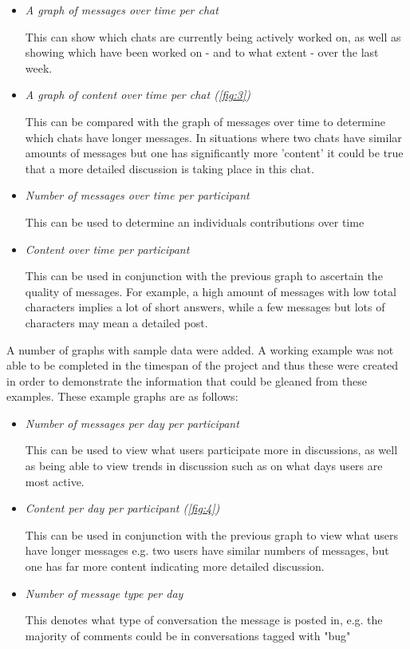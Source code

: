 \documentclass{l4proj}
\begin{document}
\begin{itemize}
\item \textit{A graph of messages over time per chat}
\par This can show which chats are currently being actively worked on, as well as showing which have been worked on - and to what extent - over the last week.
\item \textit{A graph of content over time per chat (\ref{fig:3})}
\par This can be compared with the graph of messages over time to determine which chats have longer messages.  In situations where two chats have similar amounts of messages but one has significantly more 'content' it could be true that a more detailed discussion is taking place in this chat.
\item \textit{Number of messages over time per participant}
\par This can be used to determine an individuals contributions over time
\item \textit{Content over time per participant}
\par This can be used in conjunction with the previous graph to ascertain the quality of messages.  For example, a high amount of messages with low total characters implies a lot of short answers, while a few messages but lots of characters may mean a detailed post.
\end{itemize}



\newpage


A number of graphs with sample data were added.  A working example was not able to be completed in the timespan of the project and thus these were created in order to demonstrate the information that could be gleaned from these examples.  These example graphs are as follows:

\begin{itemize}
\item \textit{Number of messages per day per participant}
\par This can be used to view what users participate more in discussions, as well as being able to view trends in discussion such as on what days users are most active.
\item \textit{Content per day per participant (\ref{fig:4})}
\par This can be used in conjunction with the previous graph to view what users have longer messages e.g. two users have similar numbers of messages, but one has far more content indicating more detailed discussion.
\item \textit{Number of message type per day}
\par This denotes what type of conversation the message is posted in, e.g. the majority of comments could be in conversations tagged with "bug"
\end{itemize}
\end{document}
